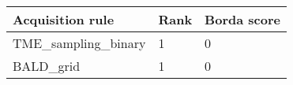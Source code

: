 \begin{tabular}{lll}
Acquisition rule & Rank & Borda score \\ 
\hline 
TME_sampling_binary & 1 & 0 \\ 
BALD_grid & 1 & 0 \\ 
\hline 
\end{tabular}